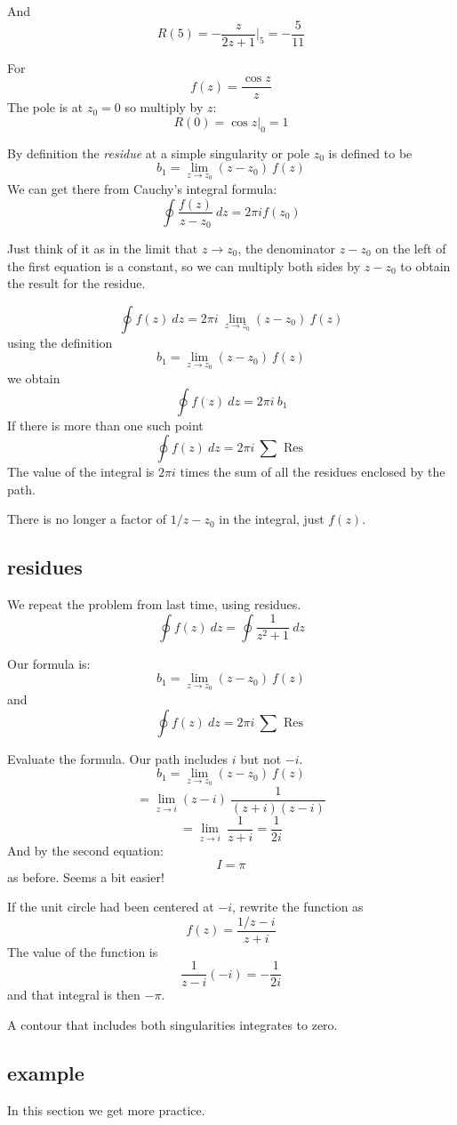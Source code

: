 \documentclass[11pt, oneside]{article}
\begin{document}
And
\[ R(5) = -\frac{z}{2z + 1} \bigg |_5 = - \frac{5}{11} \]

For
\[ f(z) = \frac{\cos z}{z} \]
The pole is at $z_0 = 0$ so multiply by $z$:
\[ R(0) = \cos z \bigg |_0 = 1 \]


By definition the \emph{residue} at a simple singularity or pole $z_0$ is defined to be
\[ b_1 = \lim_{z \rightarrow z_0} (z-z_0) \ f(z)  \]
We can get there from Cauchy's integral formula:
\[  \oint \frac{f(z)}{z - z_0} \ dz = 2 \pi i f(z_0) \]

Just think of it as in the limit that $z \rightarrow z_0$, the denominator $z-z_0$ on the left of the first equation is a constant, so we can multiply both sides by $z - z_0$
to obtain the result for the residue.

\[ \oint f(z) \ dz = 2 \pi i \ \lim_{z \rightarrow z_0} (z-z_0) \ f(z)  \]
using the definition
\[ b_1 = \lim_{z \rightarrow z_0} (z-z_0) \ f(z)  \]
we obtain
\[ \oint f(z) \ dz = 2 \pi i \ b_1  \]
If there is more than one such point
\[ \oint f(z) \ dz = 2 \pi i \ \sum \text{ Res } \]
The value of the integral is $2 \pi i$ times the sum of all the residues enclosed by the path.

There is no longer a factor of $1/z-z_0$ in the integral, just $f(z)$.

\subsection*{residues}
We repeat the problem from last time, using residues.  
\[ \oint f(z) \ dz = \oint \frac{1}{z^2 + 1} \ dz \]

Our formula is:
\[ b_1 = \lim_{z \rightarrow z_0} (z-z_0) \ f(z)  \]
and
\[ \oint f(z) \ dz = 2 \pi i \ \sum \text{ Res } \]

Evaluate the formula.  Our path includes $i$ but not $-i$.
\[ b_1 = \lim_{z \rightarrow z_0} (z-z_0) \ f(z)  \]
\[ = \lim_{z \rightarrow i} (z-i) \  \frac{1}{(z+i)(z-i)} \]
\[ = \lim_{z \rightarrow i}  \  \frac{1}{z+i} = \frac{1}{2i} \]
And by the second equation:
\[ I = \pi \]
as before.  Seems a bit easier!

If the unit circle had been centered at $-i$, rewrite the function as
\[ f(z) = \frac{1/z-i}{z+i} \]
The value of the function is
\[ \frac{1}{z-i}(-i) = -\frac{1}{2i} \]
and that integral is then $- \pi$.

A contour that includes both singularities integrates to zero.

\subsection*{example}
In this section we get more practice.
\end{document}
